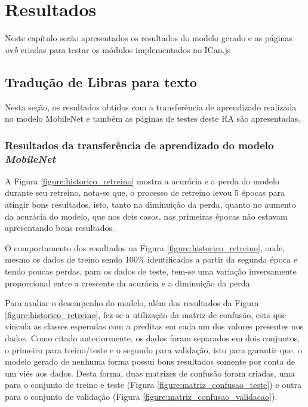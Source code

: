 \newpage
\chapter{Resultados}

\par Neste capítulo serão apresentados os resultados do modelo gerado e as páginas \textit{web} criadas para testar os módulos implementados no ICan.js

\section{Tradução de Libras para texto}

\par Nesta seção, os resultados obtidos com a transferência de aprendizado realizada no modelo MobileNet e também as páginas de testes deste RA são apresentadas.

\subsection{Resultados da transferência de aprendizado do modelo \textit{MobileNet}}


\par A Figura \ref{figure:historico_retreino} mostra a acurácia e a perda do modelo durante seu retreino, nota-se que, o processo de retreino levou 5 épocas para atingir bons resultados, isto, tanto na diminuição da perda, quanto no aumento da acurácia do modelo, que nos dois casos, nas primeiras épocas não estavam apresentando bons resultados.

\par O comportamento dos resultados na Figura \ref{figure:historico_retreino}, onde, mesmo os dados de treino sendo 100\% identificados a partir da segunda época e tendo poucas perdas, para os dados de teste, tem-se uma variação inversamente proporcional entre a crescente da acurácia e a diminuição da perda. 

\par Para avaliar o desempenho do modelo, além dos resultados da Figura \ref{figure:historico_retreino}, fez-se a utilização da matriz de confusão, esta que vincula as classes esperadas com a preditas em cada um dos valores presentes nos dados. Como citado anteriormente, os dados foram separados em dois conjuntos, o primeiro para treino/teste e o segundo para validação, isto para garantir que, o modelo gerado de nenhuma forma possui bons resultados somente por conta de um viés aos dados. Desta forma, duas matrizes de confusão foram criadas, uma para o conjunto de treino e teste (Figura \ref{figure:matriz_confusao_teste}) e outra para o conjunto de validação (Figura \ref{figure:matriz_confusao_validacao}).

